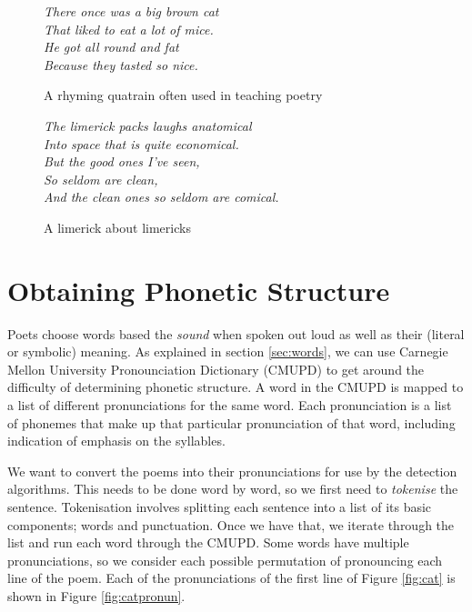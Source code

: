 \begin{figure}
\centering
\begin{minipage}{0.45\textwidth}
\centering
\textit{
There once was a big brown cat\\
That liked to eat a lot of mice.\\
He got all round and fat\\
Because they tasted so nice.
}
\caption{A rhyming quatrain often used in teaching poetry}
\label{fig:cat}
\end{minipage}\hfill
\begin{minipage}{0.45\textwidth}
\centering
\textit{
The limerick packs laughs anatomical\\
Into space that is quite economical.\\
    But the good ones I've seen,\\
    So seldom are clean,\\
And the clean ones so seldom are comical.
}
\caption{A limerick about limericks}
\label{fig:limerick}
\end{minipage}
\end{figure}


\section{Obtaining Phonetic Structure}
\label{sec:phonetic}
Poets choose words based the \textit{sound} when spoken out loud as well as their (literal or symbolic) meaning. As explained in section \ref{sec:words}, we can use Carnegie Mellon University Pronounciation Dictionary (CMUPD) to get around the difficulty of determining phonetic structure. A word in the CMUPD is mapped to a list of different pronunciations for the same word. Each pronunciation is a list of phonemes that make up that particular pronunciation of that word, including indication of emphasis on the syllables.

We want to convert the poems into their pronunciations for use by the detection algorithms. This needs to be done word by word, so we first need to \textit{tokenise} the sentence. Tokenisation involves splitting each sentence into a list of its basic components; words and punctuation. Once we have that, we iterate through the list and run each word through the CMUPD. Some words have multiple pronunciations, so we consider each possible permutation of pronouncing each line of the poem. Each of the pronunciations of the first line of Figure \ref{fig:cat} is shown in Figure \ref{fig:catpronun}.

